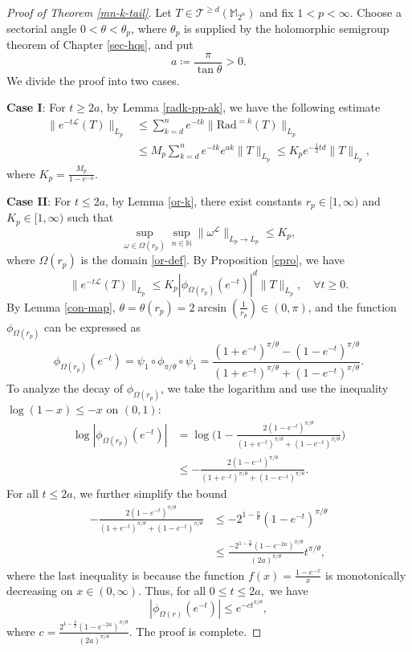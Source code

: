 \documentclass{amsbook}
\theoremstyle{definition}
\theoremstyle{remark}
\numberwithin{section}{chapter}
\numberwithin{equation}{chapter}
\newcommand{\1}{\mathbf{1}}
\begin{document}
\begin{proof}[Proof of Theorem \ref{mn-k-tail}]
 Let $T\in \mathcal{T}^{\geq d}(\mathbb{M}_{2^{n}})$ and fix $1<p<\infty$. Choose a sectorial angle $0<\theta<\theta_p$, where $\theta_p$ is supplied by the holomorphic semigroup theorem of Chapter \ref{sec-hqs}, and put
\[
a\coloneqq\frac{\pi}{\tan\theta}>0 .
\]
We divide the proof into two cases.

\textbf{Case I}: For $t\geq 2a$, by Lemma \ref{radk-pp-ak},  we have the following estimate
\begin{align*}
\|e^{-t\mathcal{L}}(T)\|_{L_{p}} &\leq \sum_{k=d}^{n} e^{-t k}\|\mathrm{Rad}^{=k} (T)\|_{L_{p}}\\ 
&\leq M_p\sum_{k=d}^{n} e^{-t k}e^{ak}\|T\|_{L_{p}}
\leq K_p e^{-\frac{1}{2} t d}\|T\|_{L_{p}},
\end{align*}
where $K_p=\frac{M_p}{1-e^{-a}}$. 

\textbf{Case II}: For $t \leq2 a$, by Lemma \ref{or-k}, there exist constants $r_p \in[1, \infty)$ and  $K_p \in[1, \infty)$  such that
$$\sup _{\omega \in \Omega(r_p)} \sup _{n \in \mathbb{N}}\|\omega^{\mathcal{L}}\|_{L_{p} \rightarrow L_{p}} \leq K_p, $$
where $\Omega(r_p)$ is the domain \eqref{or-def}. By Proposition \ref{cpro},  we have
$$\|e^{-t \mathcal{L}} (T)\|_{L_{p}} \leq K_p|\phi_{\Omega(r_p)}(e^{-t})|^{d}\|T\|_{L_{p}},\quad \forall t \geq 0.
$$
By Lemma \ref{con-map}, $\theta=\theta(r_p)=2\arcsin\left(\frac{1}{r_{p}}\right)\in(0,\pi)$, and the function $\phi_{\Omega(r_p)}$ can be expressed as
$$
\phi_{\Omega(r_p)}(e^{-t})=\psi_1\circ \phi_{\pi / \theta} \circ \psi_{1}=\frac{(1+e^{-t})^{\pi / \theta}-(1-e^{-t})^{\pi / \theta}}{(1+e^{-t})^{\pi / \theta}+(1-e^{-t})^{\pi / \theta}} .
$$
To analyze the decay of $\phi_{\Omega(r_p)}$, we take the logarithm and use the inequality $\log(1-x)\leq-x$ on $(0,1)$:
\begin{align*}
\log |\phi_{\Omega(r_p)}(e^{-t})| & =\log \Big(1-\frac{2(1-e^{-t})^{\pi / \theta}}{(1+e^{-t})^{\pi / \theta}+(1-e^{-t})^{\pi / \theta}}\Big) \\
& \leq-\frac{2(1-e^{-t})^{\pi / \theta}}{(1+e^{-t})^{\pi / \theta}+(1-e^{-t})^{\pi / \theta}}.
\end{align*}
For all $t \leq 2 a$, we further simplify the bound
\begin{align*}
-\frac{2(1-e^{-t})^{\pi / \theta}}{(1+e^{-t})^{\pi / \theta}+(1-e^{-t})^{\pi / \theta}} & \leq-2^{1-\frac{\pi}{\theta}}(1-e^{-t})^{\pi / \theta} \\
& \leq \frac{-2^{1-\frac{\pi}{\theta}}(1-e^{-2 a})^{\pi / \theta}}{(2 a)^{\pi / \theta}} t^{\pi / \theta},
\end{align*}
where the last inequality  is because the function $f(x)=\frac{1-e^{-x}}{x}$ is monotonically decreasing on $x\in(0,\infty)$. Thus,  for all $0 \leq t \leq 2 a,$  we have
\begin{equation*}
|\phi_{\Omega(r)}\left(e^{-t}\right)| \leq e^{-c t^{\pi / \theta}}, 
\end{equation*}
where $c=\frac{2^{1-\frac{\pi}{\theta}}\left(1-e^{-2 a}\right)^{\pi / \theta}}{(2 a)^{\pi / \theta}}$. The proof is complete.
\end{proof}
\end{document}
